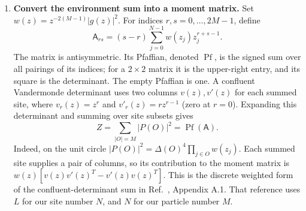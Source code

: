\begin{enumerate}
\item \textbf{Convert the environment sum into a moment matrix.}
Set $w(z)=z^{-2(M-1)}|g(z)|^2$. For indices $r,s=0,\ldots,2M-1$, define
\begin{equation}
 \mathsf A_{rs}=(s-r)\sum_{j=0}^{N-1}w(z_j)z_j^{r+s-1}.
 \label{eq:pf-moment}
\end{equation}
The matrix is antisymmetric. Its Pfaffian, denoted $\operatorname{Pf}$,
is the signed sum over all pairings of its indices; for a $2\times2$
matrix it is the upper-right entry, and its square is the determinant.
The empty Pfaffian is one. A confluent Vandermonde determinant uses
two columns $v(z),v'(z)$ for each summed site, where $v_r(z)=z^r$ and
$v'_r(z)=rz^{r-1}$ (zero at $r=0$). Expanding this determinant and summing
over site subsets gives
\begin{equation}
 Z=\sum_{|O|=M}|P(O)|^2=\operatorname{Pf}(\mathsf A).
 \label{eq:pf-norm}
\end{equation}
Indeed, on the unit circle $|P(O)|^2=\Delta(O)^4\prod_{j\in O}w(z_j)$.
Each summed site supplies a pair of columns, so its contribution to
the moment matrix is $w(z)[v(z)v'(z)^T-v'(z)v(z)^T]$.
This is the discrete weighted form of the confluent-determinant sum in
Ref.~\cite{Stephan}, Appendix A.1. That reference uses $L$ for our site
number $N$, and $N$ for our particle number $M$.


\end{enumerate}
